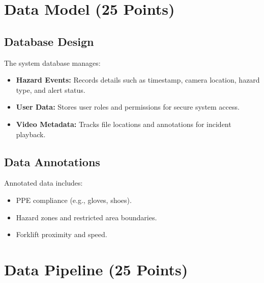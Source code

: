 \documentclass[12pt]{article}
\begin{document}
\newpage
\section{Data Model (25 Points)}
\subsection{Database Design}
The system database manages:
\begin{itemize}
    \item \textbf{Hazard Events:} Records details such as timestamp, camera location, hazard type, and alert status.
    \item \textbf{User Data:} Stores user roles and permissions for secure system access.
    \item \textbf{Video Metadata:} Tracks file locations and annotations for incident playback.
\end{itemize}


\subsection{Data Annotations}
Annotated data includes:
\begin{itemize}
    \item PPE compliance (e.g., gloves, shoes).
    \item Hazard zones and restricted area boundaries.
    \item Forklift proximity and speed.
\end{itemize}

\section{Data Pipeline (25 Points)}
\end{document}
